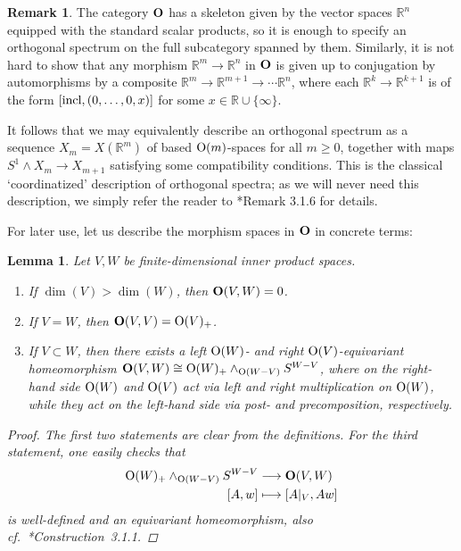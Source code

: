 \documentclass[reqno]{memo-l}
\theoremstyle{mythm}
\newtheorem{lemma}[thm]{Lemma}
\theoremstyle{definition}
\newtheorem{rk}[thm]{Remark}
\numberwithin{equation}{section}
\newcommand{\R} {{\mathbb{R}}}
\newcommand{\cat}[1]{\textbf{\textup{#1}}}
\renewcommand{\O}{{\textup{O}}}
\let\smashp=\wedge
\newcommand{\incl}{{\mathop{\textup{incl}}}}
\begin{document}
\begin{rk}
    The category $\cat{O}$ has a skeleton given by the vector spaces $\R^n$ equipped with the standard scalar products, so it is enough to specify an orthogonal spectrum on the full subcategory spanned by them. Similarly, it is not hard to show that any morphism $\R^m\to\R^n$ in $\cat{O}$ is given up to conjugation by automorphisms by a composite $\R^m\to\R^{m+1}\to\cdots\R^n$, where each $\R^k\to\R^{k+1}$ is of the form $[\incl,(0,\dots,0,x)]$ for some $x\in\R\cup\{\infty\}$. 
    
    It follows that we may equivalently describe an orthogonal spectrum as a sequence $X_m=X(\R^m)$ of based $\O(m)$-spaces for all $m\ge0$, together with maps $S^1\smashp X_m\to X_{m+1}$ satisfying some compatibility conditions. This is the classical `coordinatized' description of orthogonal spectra; as we will never need this description, we simply refer the reader to \cite{schwede2018global}*{Remark 3.1.6} for details.
\end{rk}

For later use, let us describe the morphism spaces in $\cat{O}$ in concrete terms:

\begin{lemma}\label{lemma:O-mapping-spaces}
    Let $V,W$ be finite-dimensional inner product spaces.
    \begin{enumerate}
        \item If $\dim(V)>\dim(W)$, then $\cat{O}(V,W)=0$.
        \item If $V=W$, then $\cat{O}(V,V)=\O(V)_+$.
        \item If $V\subset W$, then there exists a left $\O(W)$- and right $\O(V)$-equivariant homeomorphism $\cat{O}(V,W)\cong \O(W)_+\smashp_{\O(W-V)}S^{W-V}$, where on the right-hand side $\O(W)$ and $\O(V)$ act via left and right multiplication on $\O(W)$, while they act on the left-hand side via post- and precomposition, respectively.
    \end{enumerate}
    \begin{proof}
        The first two statements are clear from the definitions. For the third statement, one easily checks that 
        \begin{align*}
            \O(W)_+\smashp_{\O(W-V)}S^{W-V} &\longrightarrow \cat{O}(V,W)\\
            [A,w] &\longmapsto [A|_{V}, Aw]
        \end{align*}
        is well-defined and an equivariant homeomorphism, also cf.\ \cite{schwede2018global}*{Construction~3.1.1}.
    \end{proof}
\end{lemma}
\end{document}
